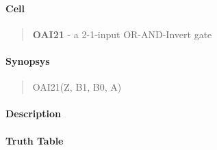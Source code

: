 \label{OAI21}
\paragraph{Cell}
\begin{quote}
    \textbf{OAI21} - a 2-1-input OR-AND-Invert gate
\end{quote}

\paragraph{Synopsys}
\begin{quote}
    OAI21(Z, B1, B0, A)
\end{quote}

\paragraph{Description}



\paragraph{Truth Table}


